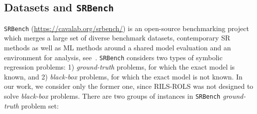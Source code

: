 \documentclass{bmcart}
\begin{document}
\subsection{Datasets and \texttt{SRBench}}

\texttt{SRBench} (\url{https://cavalab.org/srbench/}) is an open-source benchmarking project which merges a large set of diverse benchmark datasets, contemporary SR methods as well as ML methods around a shared model evaluation and an environment for analysis, see~\cite{la2021contemporary}. \texttt{SRBench} considers two types of symbolic regression problems: 1) \emph{ground-truth} problems, for which the exact model is known, and 2) \emph{black-box} problems, for which the exact model is not known. In our work, we consider only the former one, since \textsc{RILS-ROLS} was not designed to solve \emph{black-box} problems. There are two groups of instances in \texttt{SRBench} \emph{ground-truth} problem set:
\end{document}
